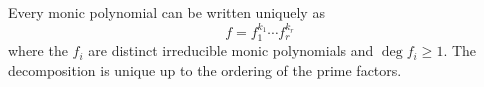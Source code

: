 Every monic polynomial can be written uniquely as
$$f = f_1^{k_1} \cdots f_r^{k_r}$$
where the $f_i$ are distinct irreducible monic polynomials and $\deg f_i \geq 1$. The decomposition is unique up to the ordering of the prime factors.
